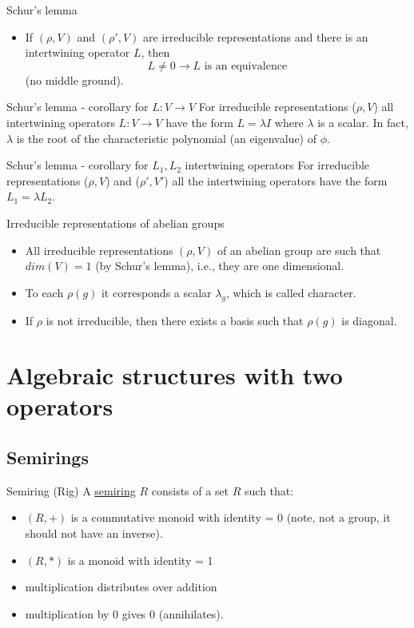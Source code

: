 \documentclass[presentation]{beamer}
\begin{document}
\begin{frame}[label={sec:org173193e}]{Schur's lemma}
\begin{itemize}
\item If \((\rho, V)\) and \((\rho', V)\) are irreducible representations and there
is an intertwining operator \(L\), \alert{then} $$L \neq 0 \rightarrow L
       \textrm{~is an equivalence}$$ (no middle ground).
\end{itemize}
\end{frame}
\begin{frame}[label={sec:org61bce5e}]{Schur's lemma - corollary for \(L : V \rightarrow V\)}
For irreducible representations (\(\rho,V\)) all intertwining operators \(L: V
     \rightarrow V\) have the form \(L=\lambda I\) where \(\lambda\) is a scalar. In
fact, \(\lambda\) is the root of the characteristic polynomial (an
eigenvalue) of \(\phi\).
\end{frame}
\begin{frame}[label={sec:orge55207d}]{Schur's lemma - corollary for \(L_1, L_2\) intertwining operators}
For irreducible representations (\(\rho, V\)) and (\(\rho', V'\)) all the intertwining
operators have the form \(L_1 = \lambda L_2\).
\end{frame}
\begin{frame}[label={sec:orgc381750}]{Irreducible representations of abelian groups}
\begin{itemize}
\item All irreducible representations \((\rho, V)\) of an abelian group are such that
\(dim(V)=1\) (by Schur's lemma), i.e., they are one dimensional.
\item To each \(\rho(g)\) it corresponds a scalar \(\lambda_g\), which is called \alert{character}.
\item If \(\rho\) is not irreducible, then there exists a basis such that
\(\rho(g)\) is diagonal.
\end{itemize}
\end{frame}
\section{Algebraic structures with two operators}
\label{sec:org9df4c0d}
\subsection{Semirings}
\label{sec:org1f51d7d}
\begin{frame}[label={sec:org701fa73}]{Semiring (Rig)}
A \href{https://en.wikipedia.org/wiki/Semiring}{semiring} \(R\) consists of a set \(R\) such that:

\begin{itemize}
\item \((R, +)\) is a commutative monoid with identity = 0 (note, \alert{not a group}, it
should not have an inverse).
\item \((R, *)\) is a monoid with identity = 1
\item multiplication distributes over addition
\item multiplication by 0 gives 0 (annihilates).
\end{itemize}
\end{frame}
\end{document}

